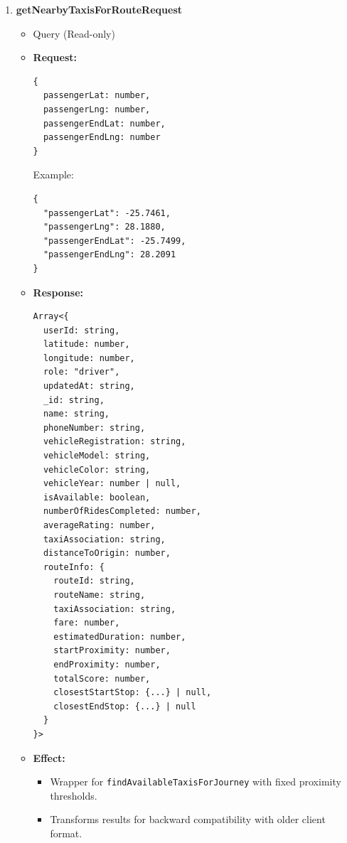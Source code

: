 \documentclass[a4paper,12pt]{article}
\begin{document}
\begin{enumerate}
  \item \textbf{getNearbyTaxisForRouteRequest}
  \begin{itemize}
    \item Query (Read-only)
    \item \textbf{Request:}
    \begin{verbatim}
{
  passengerLat: number,
  passengerLng: number,
  passengerEndLat: number,
  passengerEndLng: number
}
    \end{verbatim}
    Example:
    \begin{verbatim}
{
  "passengerLat": -25.7461,
  "passengerLng": 28.1880,
  "passengerEndLat": -25.7499,
  "passengerEndLng": 28.2091
}
    \end{verbatim}
    \item \textbf{Response:}
    \begin{verbatim}
Array<{
  userId: string,
  latitude: number,
  longitude: number,
  role: "driver",
  updatedAt: string,
  _id: string,
  name: string,
  phoneNumber: string,
  vehicleRegistration: string,
  vehicleModel: string,
  vehicleColor: string,
  vehicleYear: number | null,
  isAvailable: boolean,
  numberOfRidesCompleted: number,
  averageRating: number,
  taxiAssociation: string,
  distanceToOrigin: number,
  routeInfo: {
    routeId: string,
    routeName: string,
    taxiAssociation: string,
    fare: number,
    estimatedDuration: number,
    startProximity: number,
    endProximity: number,
    totalScore: number,
    closestStartStop: {...} | null,
    closestEndStop: {...} | null
  }
}>
    \end{verbatim}
    \item \textbf{Effect:}
    \begin{itemize}
      \item Wrapper for \texttt{findAvailableTaxisForJourney} with fixed proximity thresholds.
      \item Transforms results for backward compatibility with older client format.
    \end{itemize}
  \end{itemize}


\end{enumerate}
\end{document}
